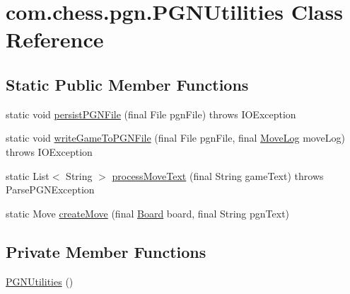 \hypertarget{classcom_1_1chess_1_1pgn_1_1_p_g_n_utilities}{}\section{com.\+chess.\+pgn.\+P\+G\+N\+Utilities Class Reference}
\label{classcom_1_1chess_1_1pgn_1_1_p_g_n_utilities}
\subsection*{Static Public Member Functions}
\begin{DoxyCompactItemize}
\item 
static void \mbox{\hyperlink{classcom_1_1chess_1_1pgn_1_1_p_g_n_utilities_a9b29222faa6cbfc5b997f86e7c6778c6}{persist\+P\+G\+N\+File}} (final File pgn\+File)  throws I\+O\+Exception 
\item 
static void \mbox{\hyperlink{classcom_1_1chess_1_1pgn_1_1_p_g_n_utilities_af1059e9beab511dd4974367edcb26318}{write\+Game\+To\+P\+G\+N\+File}} (final File pgn\+File, final \mbox{\hyperlink{classcom_1_1chess_1_1gui_1_1_table_1_1_move_log}{Move\+Log}} move\+Log)  throws I\+O\+Exception 
\item 
static List$<$ String $>$ \mbox{\hyperlink{classcom_1_1chess_1_1pgn_1_1_p_g_n_utilities_adc691fa81d10b050de2169346360dfbf}{process\+Move\+Text}} (final String game\+Text)  throws Parse\+P\+G\+N\+Exception 
\item 
static Move \mbox{\hyperlink{classcom_1_1chess_1_1pgn_1_1_p_g_n_utilities_a85f7e44103f7bdb51cc6714974fd9326}{create\+Move}} (final \mbox{\hyperlink{classcom_1_1chess_1_1engine_1_1classic_1_1board_1_1_board}{Board}} board, final String pgn\+Text)
\end{DoxyCompactItemize}
\subsection*{Private Member Functions}
\begin{DoxyCompactItemize}
\item 
\mbox{\hyperlink{classcom_1_1chess_1_1pgn_1_1_p_g_n_utilities_a958310bdf2db804967035407d21b6fe3}{P\+G\+N\+Utilities}} ()
\end{DoxyCompactItemize}
